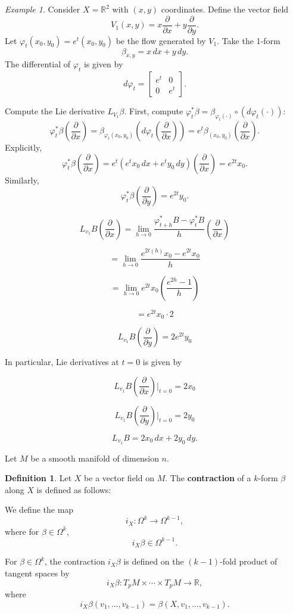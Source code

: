 \documentclass[11pt]{article}
\theoremstyle{definition}
\newtheorem{definition}{Definition}[section]
\theoremstyle{remark}
\newtheorem{example}{Example}[section]
\begin{document}
\begin{example}\label{ex:lie_derivative}
Consider $X = \mathbb{R}^2$ with $(x,y)$ coordinates. Define the vector field
\[
V_1(x,y) = x \frac{\partial}{\partial x} + y \frac{\partial}{\partial y}.
\]
Let $\varphi_t(x_0,y_0) = e^t(x_0,y_0)$ be the flow generated by $V_1$. Take the 1-form
\[
\beta_{x,y} = x\,dx + y\,dy.
\]
The differential of $\varphi_t$ is given by
\[
d\varphi_t = \begin{bmatrix}
e^t & 0 \\
0 & e^t
\end{bmatrix}.
\]

Compute the Lie derivative $L_{V_1}\beta$. First, compute $\varphi_t^*\beta = \beta_{\varphi_t(\cdot)} \circ (d\varphi_t(\cdot))$:
\[
\varphi_t^*\beta\left(\frac{\partial}{\partial x}\right) = \beta_{\varphi_t(x_0,y_0)}\left(d\varphi_t\left(\frac{\partial}{\partial x}\right)\right) = e^t \beta_{(x_0,y_0)}\left(\frac{\partial}{\partial x}\right).
\]
Explicitly,
\[
\varphi_t^*\beta\left(\frac{\partial}{\partial x}\right) = e^t \left(e^t x_0\,dx + e^t y_0\,dy\right)\left(\frac{\partial}{\partial x}\right) = e^{2t} x_0.
\]
Similarly,
\[
\varphi_t^*\beta\left(\frac{\partial}{\partial y}\right) = e^{2t} y_0.
\]
\end{example}

\[
L_{v_1} B \left( \frac{\partial}{\partial x} \right) = \lim_{h \to 0} \frac{\varphi_{t+h}^* B - \varphi_t^* B}{h} \left( \frac{\partial}{\partial x} \right)
\]

\[
= \lim_{h \to 0} \frac{e^{2t(h)} x_0 - e^{2t} x_0}{h}
\]

\[
= \lim_{h \to 0} e^{2t} x_0 \left( \frac{e^{2h} - 1}{h} \right)
\]

\[
= e^{2t} x_0 \cdot 2
\]

\[
L_{v_1} B \left( \frac{\partial}{\partial y} \right) = 2 e^{2t} y_0
\]

In particular, Lie derivatives at \( t = 0 \) is given by

\[
L_{v_1} B \left( \frac{\partial}{\partial x} \right) \bigg|_{t=0} = 2 x_0
\]

\[
L_{v_1} B \left( \frac{\partial}{\partial y} \right) \bigg|_{t=0} = 2 y_0
\]

\[
L_{v_1} B = 2 x_0 \, dx + 2 y_0 \, dy.
\]

Let $M$ be a smooth manifold of dimension $n$.

\begin{definition}\label{def:contraction}
Let $X$ be a vector field on $M$. The \textbf{contraction} of a $k$-form $\beta$ along $X$ is defined as follows:

We define the map
\[
i_X \colon \Omega^k \to \Omega^{k-1},
\]
where for $\beta \in \Omega^k$,
\[
i_X \beta \in \Omega^{k-1}.
\]

For $\beta \in \Omega^k$, the contraction $i_X \beta$ is defined on the $(k-1)$-fold product of tangent spaces by
\[
i_X \beta \colon T_p M \times \cdots \times T_p M \to \mathbb{R},
\]
where
\[
i_X \beta(v_1, \ldots, v_{k-1}) = \beta(X, v_1, \ldots, v_{k-1}).
\]
\end{definition}
\end{document}
